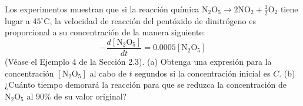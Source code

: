 \item Los experimentos muestran que si la reacción química $\text{N}_2\text{O}_5 \to 2\text{NO}_2 + \frac{1}{2}\text{O}_2$ tiene lugar a $45^\circ\text{C}$, la velocidad de reacción del pentóxido de dinitrógeno es proporcional a su concentración de la manera siguiente:
	$$-\frac{d[\text{N}_2\text{O}_5]}{dt} = 0.0005[\text{N}_2\text{O}_5]$$
	(Véase el Ejemplo 4 de la Sección 2.3). (a) Obtenga una expresión para la concentración $[\text{N}_2\text{O}_5]$ al cabo de $t$ segundos si la concentración inicial es $C$. (b) ¿Cuánto tiempo demorará la reacción para que se reduzca la concentración de $\text{N}_2\text{O}_5$ al $90\%$ de su valor original?
